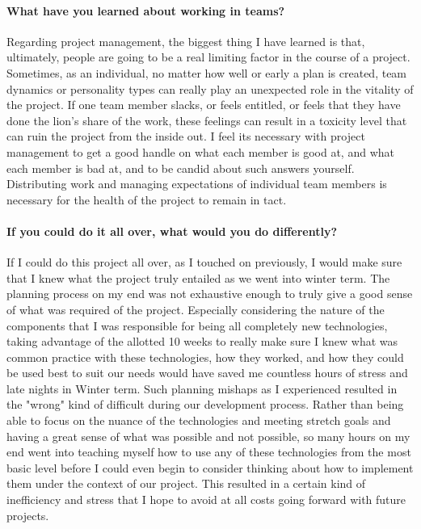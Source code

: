 \documentclass[onecolumn, draftclsnofoot,10pt, compsoc]{IEEEtran}
\begin{document}
\paragraph{What have you learned about working in teams?}
Regarding project management, the biggest thing I have learned is that, ultimately, people are going to be a real limiting factor in the course of a project. Sometimes, as an individual, no matter how well or early a plan is created, team dynamics or personality types can really play an unexpected role in the vitality of the project. If one team member slacks, or feels entitled, or feels that they have done the lion's share of the work, these feelings can result in a toxicity level that can ruin the project from the inside out. I feel its necessary with project management to get a good handle on what each member is good at, and what each member is bad at, and to be candid about such answers yourself. Distributing work and managing expectations of individual team members is necessary for the health of the project to remain in tact.
\paragraph{If you could do it all over, what would you do differently?}
If I could do this project all over, as I touched on previously, I would make sure that I knew what the project truly entailed as we went into winter term. The planning process on my end was not exhaustive enough to truly give a good sense of what was required of the project. Especially considering the nature of the components that I was responsible for being all completely new technologies, taking advantage of the allotted 10 weeks to really make sure I knew what was common practice with these technologies, how they worked, and how they could be used best to suit our needs would have saved me countless hours of stress and late nights in Winter term. Such planning mishaps as I experienced resulted in the "wrong" kind of difficult during our development process. Rather than being able to focus on the nuance of the technologies and meeting stretch goals and having a great sense of what was possible and not possible, so many hours on my end went into teaching myself how to use any of these technologies from the most basic level before I could even begin to consider thinking about how to implement them under the context of our project. This resulted in a certain kind of inefficiency and stress that I hope to avoid at all costs going forward with future projects.
\end{document}
